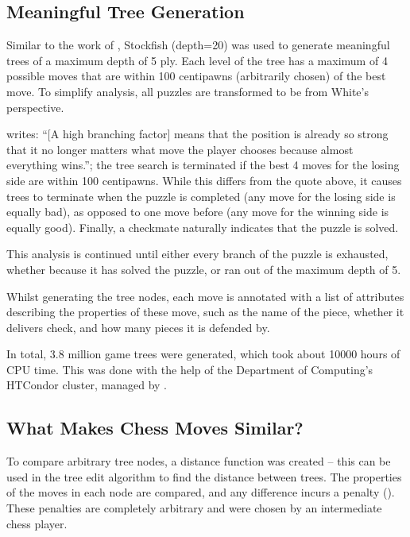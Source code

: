 \subsection{Meaningful Tree Generation}\label{treeS12}

Similar to the work of \citet{chessTrees}, Stockfish (depth=20) was used to
generate meaningful trees of a maximum depth of 5 ply. Each level of the tree
has a maximum of 4 possible moves that are within 100 centipawns (arbitrarily
chosen) of the best move. To simplify analysis, all puzzles are transformed to
be from White's perspective.

\citet{chessTrees} writes: ``[A high branching factor] means that the position
is already so strong that it no longer matters what move the player chooses
because almost everything wins.''; the tree search is terminated if the best 4
moves for the losing side are within 100 centipawns. While this differs from
the quote above, it causes trees to terminate when the puzzle is completed (any
move for the losing side is equally bad), as opposed to one move before (any
move for the winning side is equally good). Finally, a checkmate naturally
indicates that the puzzle is solved. 

This analysis is continued until either every branch of the puzzle is
exhausted, whether because it has solved the puzzle, or ran out of the maximum
depth of 5.

Whilst generating the tree nodes, each move is annotated with a list of
attributes describing the properties of these move, such as the name of the
piece, whether it delivers check, and how many pieces it is defended by.

In total, 3.8 million game trees were generated, which took about 10000 hours
of CPU time. This was done with the help of the Department of Computing's
HTCondor cluster, managed by \citet{csgCondor}.

\subsection{What Makes Chess Moves Similar?}\label{treeS13}

To compare arbitrary tree nodes, a distance function was created -- this can be
used in the tree edit algorithm to find the distance between trees. The
properties of the moves in each node are compared, and any difference incurs a
penalty (). These penalties are completely arbitrary and
were chosen by an intermediate chess player.

